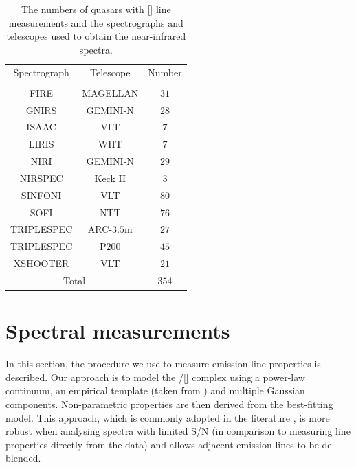 \begin{table}
  \centering
  \footnotesize
    \begin{tabular}{ccc}
    \hline
    Spectrograph & Telescope & Number \\
                 &           & \\
    \hline
    FIRE         & MAGELLAN  & $31$ \\
    GNIRS        & GEMINI-N  & $28$ \\
    ISAAC        & VLT       & $7$ \\
    LIRIS        & WHT       & $7$ \\
    NIRI         & GEMINI-N  & $29$ \\
    NIRSPEC      & Keck II   & $3$ \\
    SINFONI      & VLT       & $80$ \\
    SOFI         & NTT       & $76$ \\
    TRIPLESPEC   & ARC-$3.5$m  & $27$ \\
    TRIPLESPEC   & P$200$      & $45$ \\
    XSHOOTER     & VLT       & $21$ \\
    \hline
    \multicolumn{2}{c}{Total} & $354$ \\
    \hline
    \end{tabular}
    \caption[{The numbers of quasars with [] line measurements and the spectrographs and telescopes used to obtain the near-infrared spectra.}]{The numbers of quasars with [] line measurements and the spectrographs and telescopes used to obtain the near-infrared spectra.}
  \label{tab:specnums_ch4}
\end{table}

\section{Spectral measurements}

In this section, the procedure we use to measure emission-line properties is described.
Our approach is to model the \hbns/[] complex using a power-law continuum, an empirical  template (taken from \citealt{boroson92}) and multiple Gaussian components.
Non-parametric properties are then derived from the best-fitting model.
This approach, which is commonly adopted in the literature \citep[e.g.][]{shen11,shen12,shen16a}, is more robust when analysing spectra with limited S/N (in comparison to measuring line properties directly from the data) and allows adjacent emission-lines to be de-blended.

